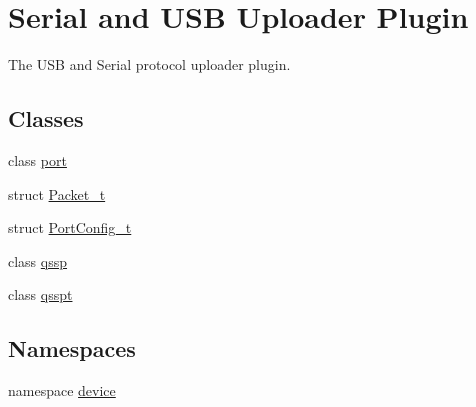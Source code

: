 \hypertarget{group___uploader}{\section{\-Serial and \-U\-S\-B \-Uploader \-Plugin}
\label{group___uploader}
}


\-The \-U\-S\-B and \-Serial protocol uploader plugin.  


\subsection*{\-Classes}
\begin{DoxyCompactItemize}
\item 
class \hyperlink{classport}{port}
\item 
struct \hyperlink{struct_packet__t}{\-Packet\-\_\-t}
\item 
struct \hyperlink{struct_port_config__t}{\-Port\-Config\-\_\-t}
\item 
class \hyperlink{classqssp}{qssp}
\item 
class \hyperlink{classqsspt}{qsspt}
\end{DoxyCompactItemize}
\subsection*{\-Namespaces}
\begin{DoxyCompactItemize}
\item 
namespace \hyperlink{namespacedevice}{device}
\end{DoxyCompactItemize}
